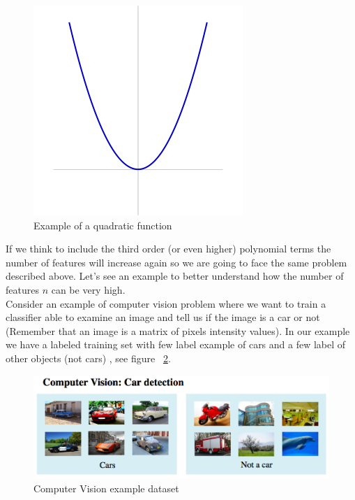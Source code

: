 \begin{figure}[H]
\begin{center}
\includegraphics[scale=0.15]{images/ellipse}
\end{center}
\caption{Example of a quadratic function} 
\label{ellipse}
\end{figure}

If we think to include the third order (or even higher) polynomial terms the number of features will increase again so we are going to face the same problem described above. Let's see an example to better understand how the number of features $n$ can be very high.
\\
Consider an example of computer vision problem where we want to train a classifier able to examine an image and tell us if the image is a car or not (Remember that an image is a matrix of pixels intensity values).
In our example we have a labeled training set with few label example of cars and a few label of other objects (not cars) , see figure ~\ref{cv-dataset}.

\begin{figure}[H]
\begin{center}
\includegraphics[scale=0.25,natwidth=1357, natheight=2496]{images/cv-dataset}
\end{center}
\caption{Computer Vision example dataset} 
\label{cv-dataset}
\end{figure}

